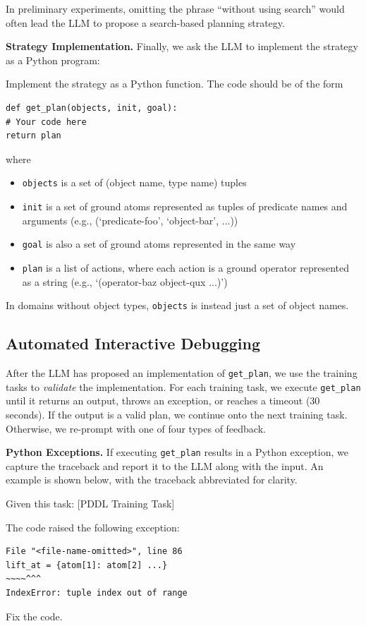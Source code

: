 \documentclass[letterpaper]{article} %
\begin{document}
In preliminary experiments, omitting the phrase ``without using search'' would often lead the LLM to propose a search-based planning strategy.

\textbf{Strategy Implementation.}
Finally, we ask the LLM to implement the strategy as a Python program:

\begin{tcolorbox}[left=2pt,right=2pt]
\footnotesize
Implement the strategy as a Python function. The code should be of the form

\begin{verbatim}
def get_plan(objects, init, goal):
# Your code here
return plan
\end{verbatim}

where
\begin{itemize}
\item \texttt{objects} is a set of (object name, type name) tuples
\item \texttt{init} is a set of ground atoms represented as tuples of predicate names and arguments (e.g., (`predicate-foo', `object-bar', ...))
\item \texttt{goal} is also a set of ground atoms represented in the same way
\item \texttt{plan} is a list of actions, where each action is a ground operator represented as a string (e.g., `(operator-baz object-qux ...)')
\end{itemize}
\end{tcolorbox}

In domains without object types, \texttt{objects} is instead just a set of object names.

\subsection{Automated Interactive Debugging}

After the LLM has proposed an implementation of \texttt{get\_plan}, we use the training tasks to \emph{validate} the implementation.
For each training task, we execute \texttt{get\_plan} until it returns an output, throws an exception, or reaches a timeout (30 seconds).
If the output is a valid plan, we continue onto the next training task.
Otherwise, we re-prompt with one of four types of feedback.

\textbf{Python Exceptions.} If executing \texttt{get\_plan} results in a Python exception, we capture the traceback and report it to the LLM along with the input.
An example is shown below, with the traceback abbreviated for clarity.
\begin{tcolorbox}[left=2pt,right=2pt]
Given this task: [PDDL Training Task]

The code raised the following exception:
\begin{verbatim}
File "<file-name-omitted>", line 86
lift_at = {atom[1]: atom[2] ...}
~~~~^^^
IndexError: tuple index out of range
\end{verbatim}

Fix the code.
\end{tcolorbox}
\end{document}
